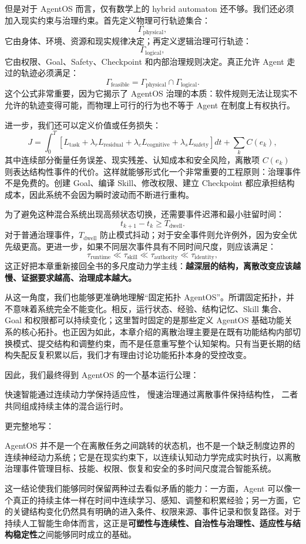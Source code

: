 但是对于 AgentOS 而言，仅有数学上的 hybrid automaton 还不够。我们还必须加入现实约束与治理约束。首先定义物理可行轨迹集合：
\[
\Gamma_{\mathrm{physical}},
\]
它由身体、环境、资源和现实规律决定；再定义逻辑治理可行轨迹：
\[
\Gamma_{\mathrm{logical}},
\]
它由权限、Goal、Safety、Checkpoint 和内部治理规则决定。真正允许 Agent 走过的轨迹必须满足：
\[
\boxed{
\Gamma_{\mathrm{feasible}}
=
\Gamma_{\mathrm{physical}}
\cap
\Gamma_{\mathrm{logical}}.
}
\]
这个公式非常重要，因为它揭示了 AgentOS 治理的本质：软件规则无法让现实不允许的轨迹变得可能，而物理上可行的行为也不等于 Agent 在制度上有权执行。

进一步，我们还可以定义价值或任务损失：
\[
J
=
\int_0^T
\left[
L_{\mathrm{task}}
+
\lambda_r L_{\mathrm{residual}}
+
\lambda_c L_{\mathrm{cognitive}}
+
\lambda_s L_{\mathrm{safety}}
\right]dt
+
\sum_k
C(e_k),
\]
其中连续部分衡量任务误差、现实残差、认知成本和安全风险，离散项 \(C(e_k)\) 则表达结构性事件的代价。这样就能够形式化一个非常重要的工程原则：治理事件不是免费的。创建 Goal、编译 Skill、修改权限、建立 Checkpoint 都应承担结构成本，因此系统不会因为瞬时波动而不断进行重构。

为了避免这种混合系统出现高频状态切换，还需要事件迟滞和最小驻留时间：
\[
t_{k+1}-t_k
\ge
T_{\mathrm{dwell}}.
\]
对于普通治理事件，\(T_{\mathrm{dwell}}\) 防止模式抖动；对于安全事件则允许例外，因为安全优先级更高。更进一步，如果不同层次事件具有不同时间尺度，则应该满足：
\[
\tau_{\mathrm{runtime}}
\ll
\tau_{\mathrm{skill}}
\ll
\tau_{\mathrm{authority}}
\ll
\tau_{\mathrm{identity}},
\]
这正好把本章重新接回全书的多尺度动力学主线：\textbf{越深层的结构，离散改变应该越慢、证据要求越高、治理成本越大。}

从这一角度，我们也能够更准确地理解“固定拓扑 AgentOS”。所谓固定拓扑，并不意味着系统完全不能变化。相反，运行状态、经验、结构记忆、Skill 集合、Goal 和权限都可以持续变化；这里暂时固定的是那些定义 AgentOS 基础功能关系的核心拓扑。也正因为如此，本章介绍的离散治理主要是在既有功能结构内部切换模式、提交结构和调整约束，而不是任意重写整个认知架构。只有当更长期的结构失配反复积累以后，我们才有理由讨论功能拓扑本身的受控改变。

因此，我们最终得到 AgentOS 的一个基本运行公理：
\begin{conclusion}
快速智能通过连续动力学保持适应性，
慢速治理通过离散事件保持结构性，
二者共同组成持续主体的混合运行时。
\end{conclusion}

更完整地写：
\begin{statementbox}
AgentOS 并不是一个在离散任务之间跳转的状态机，也不是一个缺乏制度边界的连续神经动力系统；它是在现实约束下，以连续认知动力学完成实时执行，以离散治理事件管理目标、技能、权限、恢复和安全的多时间尺度混合智能系统。
\end{statementbox}

这一结论使我们能够同时保留两种过去看似矛盾的能力：一方面，Agent 可以像一个真正的持续主体一样在时间中连续学习、感知、调整和积累经验；另一方面，它的关键结构变化仍然具有明确的进入条件、权限来源、事件记录和恢复路径。对于持续人工智能生命体而言，这正是\textbf{可塑性与连续性、自治性与治理性、适应性与结构稳定性}之间能够同时成立的基础。
